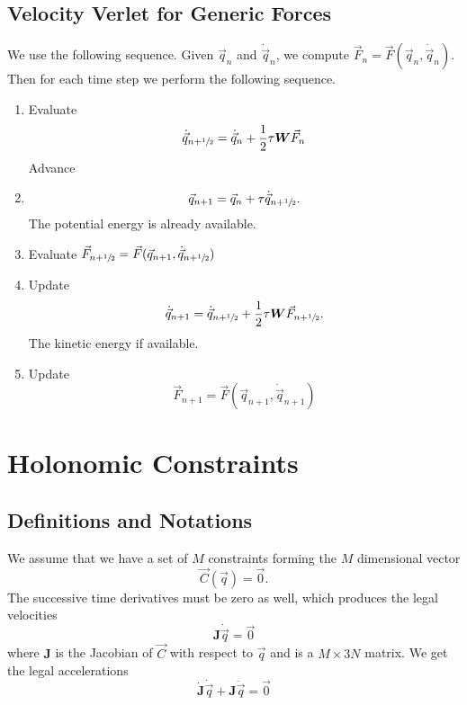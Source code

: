 \documentclass[aps,twocolumn]{revtex4}
\newcommand{\mymat}[1]{\boldsymbol{#1}}
\newcommand{\half}{\sfrac{1}{2}}
\newcommand{\q}{\vec{q}}
\newcommand{\dq}{\dot{\q}}
\newcommand{\ddq}{\ddot{\q}}
\newcommand{\C}{\vec{C}}
\newcommand{\J}{\mymat{J}}
\newcommand{\dJ}{\dot{\J}}
\newcommand{\W}{\mymat{W}}
\begin{document}
\subsection{Velocity Verlet for Generic Forces}
We use the following sequence.
Given $\q_n$ and $\dq_n$, we compute $\vec{F}_n=\vec{F}(\q_n,\dq_n)$.
Then for each time step we perform the following sequence.
\begin{enumerate}
	\item Evaluate \begin{equation} 
	\dq_{n+\half} = \dq_n + \frac{1}{2}\tau \mymat{W}\vec{F}_n
	\end{equation}
	Advance
	\item \begin{equation}
	\q_{n+1}  = \q_n + \tau \dq_{n+\half}.
	\end{equation} 
	The potential energy is already available.
	\item Evaluate $\vec{F}_{n+\half}=\vec{F}(\q_{n+1},\dq_{n+\half})$
	\item Update
	\begin{equation}
		\dq_{n+1} = \dq_{n+\half} + \frac{1}{2} \tau \W \vec{F}_{n+\half}.
	\end{equation}
	The kinetic energy if available.
	\item Update
	\begin{equation}
		\vec{F}_{n+1}=\vec{F}(\q_{n+1},\dq_{n+1})
	\end{equation}
\end{enumerate}

\section{Holonomic Constraints}
\subsection{Definitions and Notations}
We assume that we have a set of $M$ constraints forming the $M$ dimensional vector
\begin{equation}
	\C(\q) = \vec{0}.
\end{equation}
The successive time derivatives must be zero as well, which produces the legal velocities
\begin{equation}
	\J\dq = \vec{0}
\end{equation}
where $\J$ is the Jacobian of $\C$ with respect to $\q$ and is a $M\times3N$ matrix.
We get the legal accelerations
\begin{equation}
	\dJ\dq + \J\ddq = \vec{0}
\end{equation}
\end{document}
